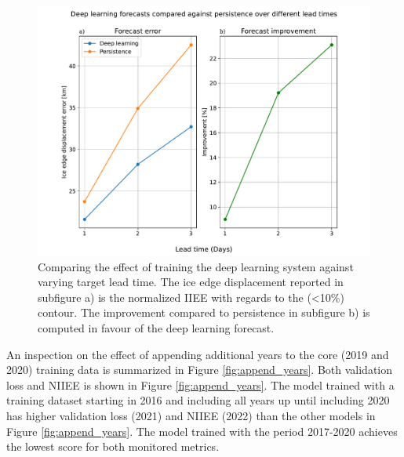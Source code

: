 \documentclass[../main/thesis]{subfiles}
\begin{document}
\begin{figure}
    \centering
    \includegraphics[width=\textwidth]{lead_times.pdf}
    \caption{\label{fig:lead_times}Comparing the effect of training the deep learning system against varying target lead time. The ice edge displacement reported in subfigure a) is the normalized IIEE with regards to the (<10\%) contour. The improvement compared to persistence in subfigure b) is computed in favour of the deep learning forecast.}
\end{figure}

An inspection on the effect of appending additional years to the core (2019 and 2020) training data is summarized in Figure \ref{fig:append_years}. Both validation loss and NIIEE is shown in Figure \ref{fig:append_years}. The model trained with a training dataset starting in 2016 and including all years up until including 2020 has higher validation loss (2021) and NIIEE (2022) than the other models in Figure \ref{fig:append_years}. The model trained with the period 2017-2020 achieves the lowest score for both monitored metrics.
\end{document}
